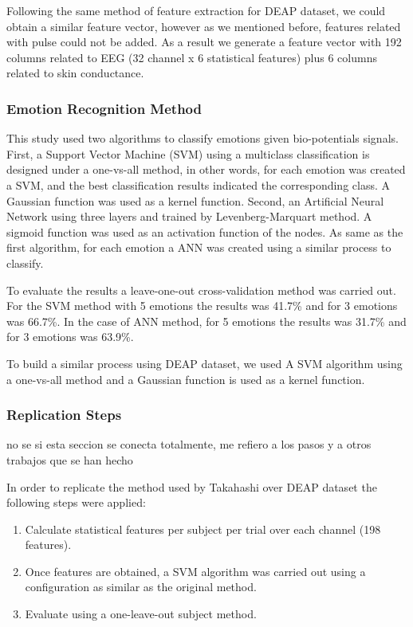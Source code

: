 \documentclass{sig-alternate}
\begin{document}
Following the same method of feature extraction for DEAP dataset, 
we could obtain a similar feature vector, however as we mentioned before, 
features related with pulse could not be added. As a result we generate 
a feature vector with 192 columns related to EEG (32 channel x 6 statistical 
features) plus 6 columns related to skin conductance.

\subsubsection{Emotion Recognition Method}

This study used two algorithms to classify emotions given bio-potentials signals.
First, a Support Vector Machine (SVM) using a multiclass classification is designed under 
a one-vs-all method, in other words, for each emotion was created a SVM, and the best
classification results indicated the corresponding class. A Gaussian function was used as a kernel function.
Second, an Artificial Neural Network using three layers and trained by Levenberg-Marquart method.
A sigmoid function was used as an activation function of the nodes. As same as the first algorithm,
for each emotion a ANN was created using a similar process to classify.

To evaluate the results a leave-one-out cross-validation method was carried out. 
For the SVM method with 5 emotions the results was 41.7\% and for 3 emotions was 66.7\%.
In the case of ANN method, for 5 emotions the results was 31.7\% and for 3 emotions was
63.9\%.   

To build a similar process using DEAP dataset, we used A SVM algorithm using a
one-vs-all method and a Gaussian function is used as a kernel function. 

\subsubsection{Replication Steps}
{\color{red} no se si esta seccion se conecta totalmente, me refiero a los pasos y a
otros trabajos que se han hecho}

In order to replicate the method used by Takahashi over DEAP dataset the following 
steps were applied:
\begin{enumerate}
\item Calculate statistical features per subject per trial over each channel (198 features).
\item Once features are obtained, a SVM algorithm was carried out using a configuration 
as similar as the original method.
\item Evaluate using a one-leave-out subject method. 
\end{enumerate}
\end{document}
